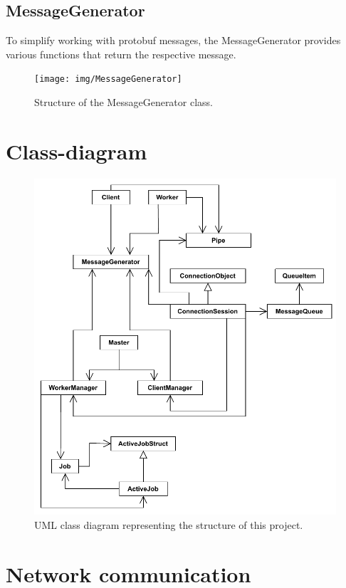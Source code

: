 \documentclass[12pt, letterpaper]{article}
\begin{document}
\subsection{MessageGenerator}

To simplify working with protobuf messages, the MessageGenerator provides various functions that return the respective message. 

\begin{figure}[h]
	\centering
	\texttt{[image: img/MessageGenerator]}
	\caption{Structure of the MessageGenerator class.}
	\label{fig:classes_MessageGenerator}
\end{figure}

\pagebreak
\section{Class-diagram}

\begin{figure}[hp]
	\centering
	\includegraphics[width=0.9\linewidth]{img/ClassDiagram}
	\caption{UML class diagram representing the structure of this project.}
	\label{fig:classDiagram}
\end{figure}

\section{Network communication}
\end{document}
